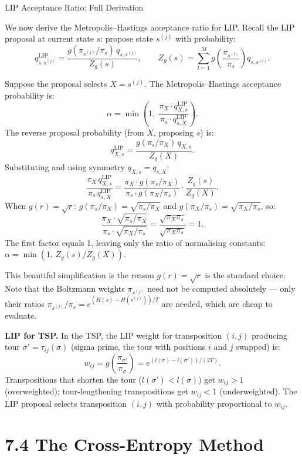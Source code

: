 \documentclass[aspectratio=169,10pt]{beamer}
\begin{document}
\begin{frame}[allowframebreaks]{LIP Acceptance Ratio: Full Derivation}

We now derive the Metropolis--Hastings acceptance ratio for LIP.
Recall the LIP proposal at current state $s$: propose state $s^{(j)}$ with
probability:
\[
  q^{\mathrm{LIP}}_{s,s^{(j)}} = \frac{g(\pi_{s^{(j)}}/\pi_s)\,q_{s,s^{(j)}}}{Z_g(s)},
  \qquad Z_g(s) = \sum_{l=1}^{M} g\!\left(\frac{\pi_{s^{(l)}}}{\pi_s}\right) q_{s,s^{(l)}}.
\]

Suppose the proposal selects $X = s^{(j)}$.  The Metropolis--Hastings
acceptance probability is:
\[
  \alpha = \min\!\left(1,\;
    \frac{\pi_X \cdot q^{\mathrm{LIP}}_{X,s}}{\pi_s \cdot q^{\mathrm{LIP}}_{s,X}}
  \right).
\]
The reverse proposal probability (from $X$, proposing $s$) is:
\[
  q^{\mathrm{LIP}}_{X,s} = \frac{g(\pi_s/\pi_X)\,q_{X,s}}{Z_g(X)}.
\]
Substituting and using symmetry $q_{X,s} = q_{s,X}$:
\[
  \frac{\pi_X\,q^{\mathrm{LIP}}_{X,s}}{\pi_s\,q^{\mathrm{LIP}}_{s,X}}
  = \frac{\pi_X \cdot g(\pi_s/\pi_X)}{\pi_s \cdot g(\pi_X/\pi_s)}
    \cdot \frac{Z_g(s)}{Z_g(X)}.
\]
When $g(r) = \sqrt{r}$: $g(\pi_s/\pi_X) = \sqrt{\pi_s/\pi_X}$ and
$g(\pi_X/\pi_s) = \sqrt{\pi_X/\pi_s}$, so:
\[
  \frac{\pi_X \cdot \sqrt{\pi_s/\pi_X}}{\pi_s \cdot \sqrt{\pi_X/\pi_s}}
  = \frac{\sqrt{\pi_X \pi_s}}{\sqrt{\pi_X \pi_s}} = 1.
\]
The first factor equals 1, leaving only the ratio of normalising constants:
$\alpha = \min(1,\, Z_g(s)/Z_g(X))$.

This beautiful simplification is the reason $g(r) = \sqrt{r}$ is the
standard choice.  Note that the Boltzmann weights $\pi_{s^{(j)}}$ need not
be computed absolutely --- only their ratios $\pi_{s^{(j)}}/\pi_s =
e^{(H(s)-H(s^{(j)}))/T}$ are needed, which are cheap to evaluate.

\textbf{LIP for TSP.}  In the TSP, the LIP weight for transposition $(i,j)$
producing tour $\sigma' = \tau_{ij}(\sigma)$ (sigma prime, the tour with
positions $i$ and $j$ swapped) is:
\[
  w_{ij} = g\!\left(\frac{\pi_{\sigma'}}{\pi_\sigma}\right)
  = e^{(l(\sigma)-l(\sigma'))/(2T)}.
\]
Transpositions that shorten the tour ($l(\sigma') < l(\sigma)$) get
$w_{ij} > 1$ (overweighted); tour-lengthening transpositions get
$w_{ij} < 1$ (underweighted).  The LIP proposal selects transposition
$(i,j)$ with probability proportional to $w_{ij}$.

\end{frame}

\section{7.4 The Cross-Entropy Method}
\end{document}
